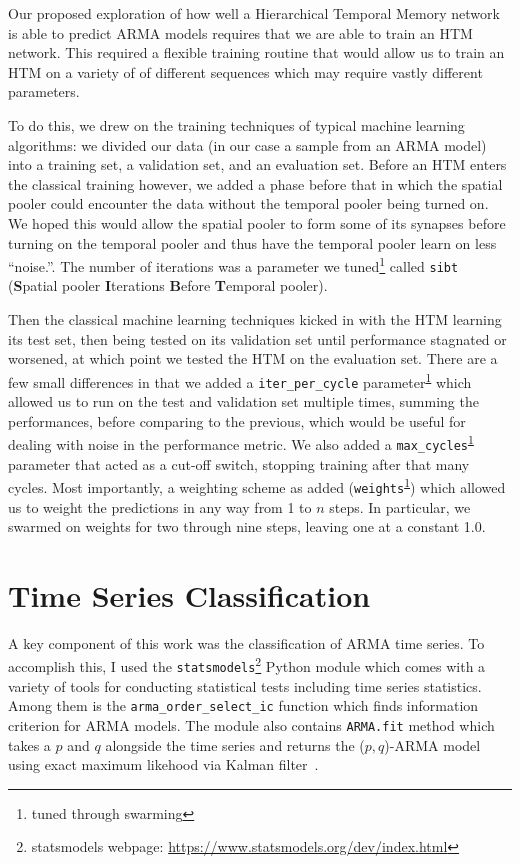 \documentclass[oneside,12pt,openany]{book}
\begin{document}
	Our proposed exploration of how well a Hierarchical Temporal Memory network is able to predict ARMA models requires that we are able to train an HTM network. This required a flexible training routine that would allow us to train an HTM on a variety of of different sequences which may require vastly different parameters. 
	
	To do this, we drew on the training techniques of typical machine learning algorithms: we divided our data (in our case a sample from an ARMA model) into a training set, a validation set, and an evaluation set. Before an HTM enters the classical training however, we added a phase before that in which the spatial pooler could encounter the data without the temporal pooler being turned on. We hoped this would allow the spatial pooler to form some of its synapses before turning on the temporal pooler and thus have the temporal pooler learn on less ``noise.''. The number of iterations was a parameter we tuned\footnote{tuned through swarming\label{footnote:swarm}} called \texttt{sibt} (\textbf{S}patial pooler \textbf{I}terations \textbf{B}efore \textbf{T}emporal pooler).
	
	Then the classical machine learning techniques kicked in with the HTM learning its test set, then being tested on its validation set until performance stagnated or worsened, at which point we tested the HTM on the evaluation set. There are a few small differences in that we added a \texttt{iter\_per\_cycle} parameter\textsuperscript{\ref{footnote:swarm}} which allowed us to run on the test and validation set multiple times, summing the performances, before comparing to the previous, which would be useful for dealing with noise in the performance metric. We also added a \texttt{max\_cycles}\textsuperscript{\ref{footnote:swarm}} parameter that acted as a cut-off switch, stopping training after that many cycles. Most importantly, a weighting scheme as added (\texttt{weights}\textsuperscript{\ref{footnote:swarm}}) which allowed us to weight the predictions in any way from 1 to $n$ steps. In particular, we swarmed on weights for two through nine steps, leaving one at a constant 1.0.
	
	\section{Time Series Classification}\label{sec:exp:timeseriesclass}

	A key component of this work was the classification of ARMA time series. To accomplish this, I used the \texttt{statsmodels}\footnote{statsmodels webpage: \href{https://www.statsmodels.org/dev/index.html}{https://www.statsmodels.org/dev/index.html}} Python module which comes with a variety of tools for conducting statistical tests including time series statistics. Among them is the \texttt{arma\_order\_select\_ic} function which finds information criterion for ARMA models. The module also contains \texttt{ARMA.fit} method which takes a $p$ and $q$ alongside the time series and returns the ($p,q$)-ARMA model using exact maximum likehood via Kalman filter~\cite{statsmodels}.
\end{document}
